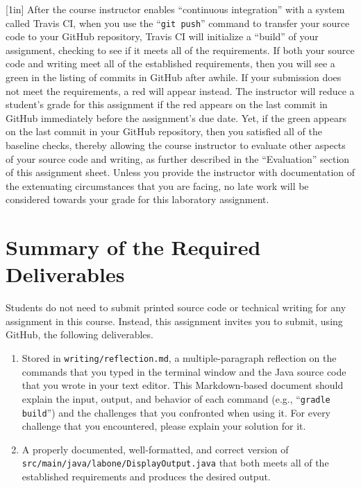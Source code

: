 \documentclass[11pt]{article}
\newcommand{\mainprogramsource}{\lstinline{src/main/java/labone/DisplayOutput.java}}
\newcommand{\reflection}{\lstinline{writing/reflection.md}}
\newcommand{\gitpush}{\command{git push}}
\newcommand{\command}[1]{``\lstinline{#1}''}
\newcommand{\step}[1]{``{#1}''}
\newcommand{\checkmark}{\ding{51}}
\newcommand{\naughtmark}{\ding{55}}
\newcommand{\caution}[1]{\null\hfill\LARGE{\faWarning{}}\newline\scriptsize{\em{#1}}}
\begin{document}
\marginnote{\caution{Verify all checks}}[1in] After the course instructor
enables \step{continuous integration} with a system called Travis CI, when you
use the \gitpush{} command to transfer your source code to your GitHub
repository, Travis CI will initialize a \step{build} of your assignment,
checking to see if it meets all of the requirements. If both your source code
and writing meet all of the established requirements, then you will see a green
\checkmark{} in the listing of commits in GitHub after awhile. If your
submission does not meet the requirements, a red \naughtmark{} will appear
instead. The instructor will reduce a student's grade for this assignment if
the red \naughtmark{} appears on the last commit in GitHub immediately before
the assignment's due date. Yet, if the green \checkmark{} appears on the last
commit in your GitHub repository, then you satisfied all of the baseline checks,
thereby allowing the course instructor to evaluate other aspects of your source
code and writing, as further described in the \step{Evaluation} section of this
assignment sheet. Unless you provide the instructor with documentation of the
extenuating circumstances that you are facing, no late work will be considered
towards your grade for this laboratory assignment.

\section*{Summary of the Required Deliverables}

\noindent Students do not need to submit printed source code or technical
writing for any assignment in this course. Instead, this assignment invites you
to submit, using GitHub, the following deliverables.

\begin{enumerate}

\setlength{\itemsep}{0in}

\item Stored in \reflection{}, a multiple-paragraph reflection on the commands
  that you typed in the terminal window and the Java source code that you wrote
  in your text editor. This Markdown-based document should explain the input,
  output, and behavior of each command (e.g., \command{gradle build}) and the
  challenges that you confronted when using it. For every challenge that you
  encountered, please explain your solution for it.

\item A properly documented, well-formatted, and correct version of
  \mainprogramsource{} that both meets all of the established requirements and
  produces the desired output.

\end{enumerate}
\end{document}
